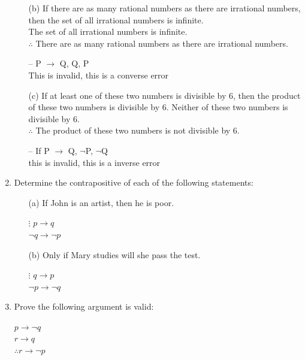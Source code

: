 \documentclass{article}
\begin{document}
\begin{enumerate}
\begin{itemize}
			
			\item[(b)] If there are as many rational numbers as there are irrational numbers, then the set of all irrational numbers is infinite.\\
			The set of all irrational numbers is infinite.\\
			$\therefore$ There are as many rational numbers as there are irrational numbers.
			\item[--]  P $\rightarrow$ Q, Q, P \\ 
			This is invalid, this is a converse error
			
			\item[(c)] If at least one of these two numbers is divisible by 6, then the product of these two numbers is divisible by 6. Neither of these two numbers is divisible by 6.\\
			$\therefore$ The product of these two numbers is not divisible by 6.
			\item[--] If P $\rightarrow$ Q, $\neg$P, $\neg$Q \\ 
			this is invalid, this is a inverse error
		\end{itemize}
		
		\item Determine the contrapositive of each of the following statements:
		\begin{itemize}
			\item[(a)] If John is an artist, then he is poor.
			\item[$\vdots$] $p \rightarrow q$ \\ $\neg q \rightarrow \neg p$
			\item[(b)] Only if Mary studies will she pass the test.
			\item[$\vdots$] $q \rightarrow p$ \\ $\neg p \rightarrow \neg q$
		\end{itemize}
		
		\item Prove the following argument is valid:
		
\begin{center}
	
	$p \rightarrow \neg q$ \\
	$r \rightarrow q$ \\
	$\therefore r \rightarrow \neg p$
	

\end{center}
\end{enumerate}
\end{document}
